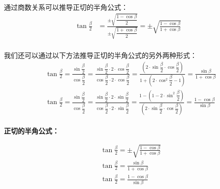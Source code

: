 \documentclass[UTF8]{ctexart}
\begin{document}
\newpage
    通过商数关系可以推导正切的半角公式：\\
    \begin{align}
        \tan{\frac{\beta}{2}}&=\frac{\pm\sqrt{\dfrac{1-\cos{\beta}}{2}}}{\pm\sqrt{\dfrac{1+\cos{\beta}}{2}}}
        =\pm\sqrt{\frac{1-\cos{\beta}}{1+\cos{\beta}}}
    \end{align}\\
    我们还可以通过以下方法推导正切的半角公式的另外两种形式：\\
    \begin{align}
        &\tan{\frac{\beta}{2}}
        =\frac{\sin{\dfrac{\beta}{2}}}{\cos{\dfrac{\beta}{2}}}
        =\frac{\sin{\dfrac{\beta}{2}}\cdot2\cdot\cos{\dfrac{\beta}{2}}}{\cos{\dfrac{\beta}{2}}\cdot2\cdot\cos{\dfrac{\beta}{2}}}
        =\frac{\left(2\cdot\sin{\dfrac{\beta}{2}}\cdot\cos{\dfrac{\beta}{2}}\right)}{1+\left(2\cdot\cos^2{\dfrac{\beta}{2}}-1\right)}
        =\frac{\sin{\beta}}{1+\cos{\beta}}\\[3mm]
        &\tan{\frac{\beta}{2}}
        =\frac{\sin{\dfrac{\beta}{2}}}{\cos{\dfrac{\beta}{2}}}
        =\frac{\sin{\dfrac{\beta}{2}}\cdot2\cdot\sin{\dfrac{\beta}{2}}}{\cos{\dfrac{\beta}{2}}\cdot2\cdot\sin{\dfrac{\beta}{2}}}
        =\frac{1-\left(1-2\cdot\sin^2{\dfrac{\beta}{2}}\right)}{\left(2\cdot\sin{\dfrac{\beta}{2}}\cdot\cos{\dfrac{\beta}{2}}\right)}
        =\frac{1-\cos{\beta}}{\sin{\beta}}
    \end{align}\\
    \newline
    \textbf{正切的半角公式：}
    \begin{large}
    \begin{align*}
        &\tan{\frac{\beta}{2}}=\pm\sqrt{\frac{1-\cos{\beta}}{1+\cos{\beta}}}\\[4mm]
        &\tan{\frac{\beta}{2}}=\frac{\sin{\beta}}{1+\cos{\beta}}\\[3mm]
        &\tan{\frac{\beta}{2}}=\frac{1-\cos{\beta}}{\sin{\beta}}
    \end{align*}
    \end{large}

\newpage
\end{document}
